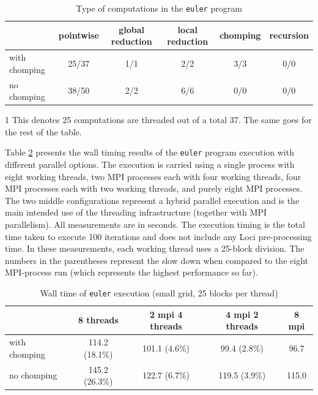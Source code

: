 \documentclass{article}
\begin{document}
\begin{table}[h]
  \begin{center}
    \begin{threeparttable}
      \caption{Type of computations in the \texttt{euler} program\label{tab:euler-mode-stat}}
      \begin{tabular}{|l|c|c|c|c|c|}
	\hline
	& pointwise & global reduction & local reduction & chomping &
	recursion\\
	\hline
	with chomping & 25/37\tnote{1} & 1/1 & 2/2 & 3/3 & 0/0\\
	no chomping & 38/50 & 2/2 & 6/6 & 0/0 & 0/0\\
	\hline
      \end{tabular}
      \begin{tablenotes}
      \item [1] This denotes 25 computations are threaded out of a total
	37.  The same goes for the rest of the table.
      \end{tablenotes}
    \end{threeparttable}
  \end{center}
\end{table}

Table \ref{tab:euler-wall-small} presents the wall timing results of the
\texttt{euler} program execution with different parallel options.  The
execution is carried using a single process with eight working threads,
two MPI processes each with four working threads, four MPI processes
each with two working threads, and purely eight MPI processes.  The
two middle configurations represent a hybrid parallel execution and is
the main intended use of the threading infrastructure (together with MPI
parallelism).  All measurements are in seconds.  The execution timing is
the total time taken to execute 100 iterations and does not include any
Loci pre-processing time.  In these measurements, each working thread
uses a 25-block division. The numbers in the parentheses represent the
slow down when compared to the eight MPI-process run (which represents
the highest performance so far).
\begin{table}[h]
  \begin{center}
    \caption{Wall time of \texttt{euler} execution (small grid, 25 blocks per thread)\label{tab:euler-wall-small}}
    \begin{tabular}{|l|c|c|c|c|}
      \hline
      & 8 threads & 2 mpi 4 threads & 4 mpi 2 threads & 8 mpi\\
      \hline
      with chomping & 114.2 (18.1\%) & 101.1 (4.6\%) & 99.4 (2.8\%) & 96.7\\ 
      no chomping & 145.2 (26.3\%) & 122.7 (6.7\%) & 119.5 (3.9\%) & 115.0\\
      \hline
    \end{tabular}
  \end{center}
\end{table}
\end{document}
